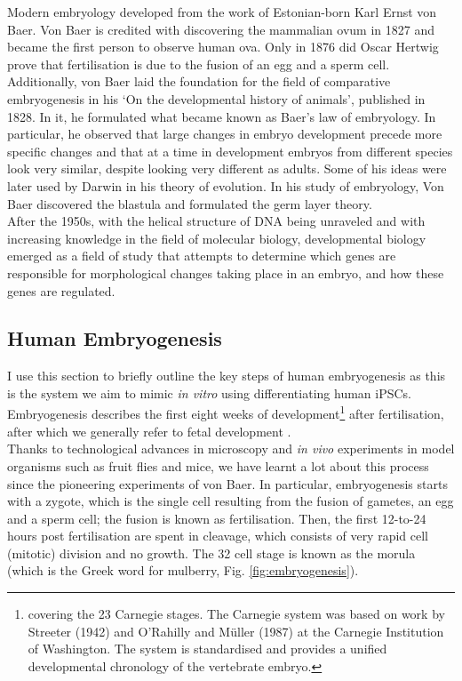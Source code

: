 Modern embryology developed from the work of Estonian-born Karl Ernst von Baer.
Von Baer is credited with discovering the mammalian ovum in 1827 and became the first person to observe human ova.
Only in 1876 did Oscar Hertwig prove that fertilisation is due to the fusion of an egg and a sperm cell.
Additionally, von Baer laid the foundation for the field of comparative embryogenesis in his `On the developmental history of animals', published in 1828.
In it, he formulated what became known as Baer's law of embryology.
In particular, he observed that large changes in embryo development precede more specific changes and that at a time in development embryos from different species look very similar, despite looking very different as adults.
Some of his ideas were later used by Darwin in his theory of evolution.
In his study of embryology, Von Baer discovered the blastula and formulated the germ layer theory.\\

After the 1950s, with the helical structure of DNA being unraveled and with increasing knowledge in the field of molecular biology, developmental biology emerged as a field of study that attempts to determine which genes are responsible for morphological changes taking place in an embryo, and how these genes are regulated.

\subsection{Human Embryogenesis}
\label{sec:human_embryogenesis}


I use this section to briefly outline the key steps of human embryogenesis as this is the system we aim to mimic \textit{in vitro} using differentiating human iPSCs.
Embryogenesis describes the first eight weeks of development\footnote{covering the 23 Carnegie stages.
The Carnegie system was based on work by Streeter (1942) and O'Rahilly and Müller (1987) at the Carnegie Institution of Washington.
The system is standardised and provides a unified developmental chronology of the vertebrate embryo.} after fertilisation, after which we generally refer to fetal development \cite{gilbert2008developmental}.\\

Thanks to technological advances in microscopy and \textit{in vivo} experiments in model organisms such as fruit flies and mice, we have learnt a lot about this process since the pioneering experiments of von Baer.
In particular, embryogenesis starts with a zygote, which is the single cell resulting from the fusion of gametes, an egg and a sperm cell; the fusion is known as fertilisation.
Then, the first 12-to-24 hours post fertilisation are spent in cleavage, which consists of very rapid cell (mitotic) division and no growth.
The 32 cell stage is known as the morula (which is the Greek word for mulberry, Fig. \ref{fig:embryogenesis}).\\

